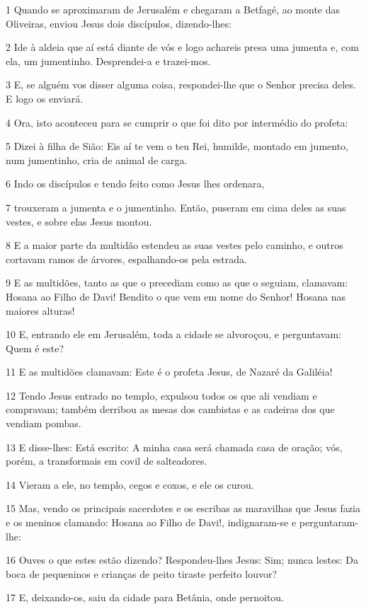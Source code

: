\par 1 Quando se aproximaram de Jerusalém e chegaram a Betfagé, ao monte das Oliveiras, enviou Jesus dois discípulos, dizendo-lhes:
\par 2 Ide à aldeia que aí está diante de vós e logo achareis presa uma jumenta e, com ela, um jumentinho. Desprendei-a e trazei-mos.
\par 3 E, se alguém vos disser alguma coisa, respondei-lhe que o Senhor precisa deles. E logo os enviará.
\par 4 Ora, isto aconteceu para se cumprir o que foi dito por intermédio do profeta:
\par 5 Dizei à filha de Sião: Eis aí te vem o teu Rei, humilde, montado em jumento, num jumentinho, cria de animal de carga.
\par 6 Indo os discípulos e tendo feito como Jesus lhes ordenara,
\par 7 trouxeram a jumenta e o jumentinho. Então, puseram em cima deles as suas vestes, e sobre elas Jesus montou.
\par 8 E a maior parte da multidão estendeu as suas vestes pelo caminho, e outros cortavam ramos de árvores, espalhando-os pela estrada.
\par 9 E as multidões, tanto as que o precediam como as que o seguiam, clamavam: Hosana ao Filho de Davi! Bendito o que vem em nome do Senhor! Hosana nas maiores alturas!
\par 10 E, entrando ele em Jerusalém, toda a cidade se alvoroçou, e perguntavam: Quem é este?
\par 11 E as multidões clamavam: Este é o profeta Jesus, de Nazaré da Galiléia!
\par 12 Tendo Jesus entrado no templo, expulsou todos os que ali vendiam e compravam; também derribou as mesas dos cambistas e as cadeiras dos que vendiam pombas.
\par 13 E disse-lhes: Está escrito: A minha casa será chamada casa de oração; vós, porém, a transformais em covil de salteadores.
\par 14 Vieram a ele, no templo, cegos e coxos, e ele os curou.
\par 15 Mas, vendo os principais sacerdotes e os escribas as maravilhas que Jesus fazia e os meninos clamando: Hosana ao Filho de Davi!, indignaram-se e perguntaram-lhe:
\par 16 Ouves o que estes estão dizendo? Respondeu-lhes Jesus: Sim; nunca lestes: Da boca de pequeninos e crianças de peito tiraste perfeito louvor?
\par 17 E, deixando-os, saiu da cidade para Betânia, onde pernoitou.
